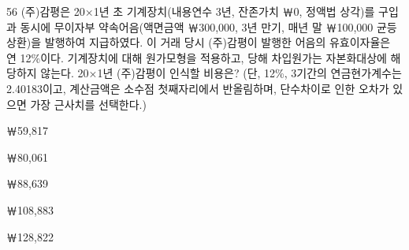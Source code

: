 \begin{question}{56}
(주)감평은 20×1년 초 기계장치(내용연수 3년, 잔존가치 ￦0, 정액법 상각)를 구입과 동시에 무이자부 약속어음(액면금액 ￦300,000, 3년 만기, 매년 말 ￦100,000 균등상환)을 발행하여 지급하였다. 이 거래 당시 (주)감평이 발행한 어음의 유효이자율은 연 12\%이다. 기계장치에 대해 원가모형을 적용하고, 당해 차입원가는 자본화대상에 해당하지 않는다. 20×1년 (주)감평이 인식할 비용은? (단, 12\%, 3기간의 연금현가계수는 2.40183이고, 계산금액은 소수점 첫째자리에서 반올림하며, 단수차이로 인한 오차가 있으면 가장 근사치를 선택한다.)
\begin{choices}
  \item ￦59,817
  \item ￦80,061
  \item ￦88,639
  \item ￦108,883
  \item ￦128,822
\end{choices}
\end{question}
